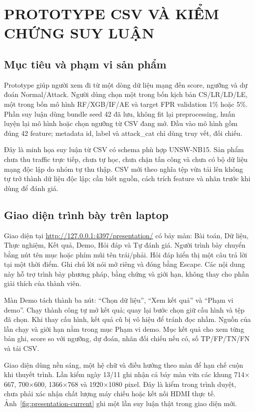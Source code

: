 \chapter{PROTOTYPE CSV VÀ KIỂM CHỨNG SUY LUẬN}\label{chap:demo}
\section{Mục tiêu và phạm vi sản phẩm}
Prototype giúp người xem đi từ một dòng dữ liệu mạng đến score, ngưỡng và dự đoán Normal/Attack. Người dùng chọn một trong bốn kịch bản CS/LR/LD/LE, một trong bốn mô hình RF/XGB/IF/AE và target FPR validation 1\% hoặc 5\%. Phần suy luận dùng bundle seed 42 đã lưu, không fit lại preprocessing, huấn luyện lại mô hình hoặc chọn ngưỡng từ CSV đang mở. Đầu vào mô hình gồm đúng 42 feature; metadata id, label và attack\_cat chỉ dùng truy vết, đối chiếu.

Đây là minh họa suy luận từ CSV có schema phù hợp UNSW-NB15. Sản phẩm chưa thu traffic trực tiếp, chưa tự học, chưa chặn tấn công và chưa có bộ dữ liệu mạng độc lập do nhóm tự thu thập. CSV mới theo nghĩa tệp vừa tải lên không tự trở thành dữ liệu độc lập; cần biết nguồn, cách trích feature và nhãn trước khi dùng để đánh giá.

\section{Giao diện trình bày trên laptop}
Giao diện tại \url{http://127.0.0.1:4397/presentation/} có bảy màn: Bài toán, Dữ liệu, Thực nghiệm, Kết quả, Demo, Hỏi đáp và Tự đánh giá. Người trình bày chuyển bằng nút tên mục hoặc phím mũi tên trái/phải. Hỏi đáp hiển thị một câu trả lời tại một thời điểm. Ghi chú lời nói mở riêng và đóng bằng Escape. Các nội dung này hỗ trợ trình bày phương pháp, bằng chứng và giới hạn, không thay cho phần giải thích của thành viên.

Màn Demo tách thành ba nút: ``Chọn dữ liệu'', ``Xem kết quả'' và ``Phạm vi demo''. Chạy thành công tự mở kết quả; quay lại bước chọn giữ cấu hình và tệp đã chọn. Khi thay cấu hình, kết quả cũ bị vô hiệu để tránh đọc nhầm. Nguồn của lần chạy và giới hạn nằm trong mục Phạm vi demo. Mục kết quả cho xem từng bản ghi, score so với ngưỡng, dự đoán, nhãn đối chiếu nếu có, số TP/FP/TN/FN và tải CSV.

Giao diện dùng nền sáng, một hệ chữ và điều hướng theo màn để hạn chế cuộn khi thuyết trình. Lần kiểm ngày 13/11 ghi nhận cả bảy màn vừa các khung 714\(\times\)667, 700\(\times\)600, 1366\(\times\)768 và 1920\(\times\)1080 pixel. Đây là kiểm trong trình duyệt, chưa phải xác nhận chất lượng máy chiếu hoặc kết nối HDMI thực tế. Ảnh~\ref{fig:presentation-current} ghi một lần suy luận thật trong giao diện mới.

